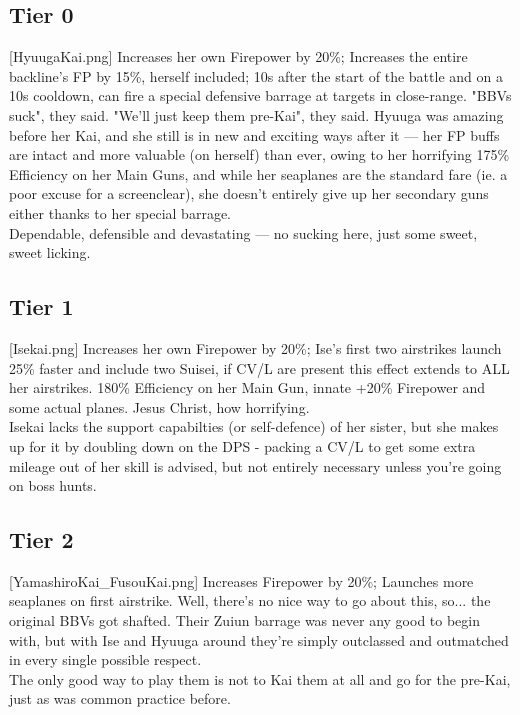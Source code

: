 \subsection{Tier 0}
[HyuugaKai.png]
{Increases her own Firepower by 20\%; Increases the entire backline's FP by 15\%, herself included; 10s after the start of the battle and on a 10s cooldown, can fire a special defensive barrage at targets in close-range.}
{"BBVs suck", they said. "We'll just keep them pre-Kai", they said.}
{Hyuuga was amazing before her Kai, and she still is in new and exciting ways after it --- her FP buffs are intact and more valuable (on herself) than ever, owing to her horrifying 175\% Efficiency on her Main Guns, and while her seaplanes are the standard fare (ie. a poor excuse for a screenclear), she doesn't entirely give up her secondary guns either thanks to her special barrage.\\
Dependable, defensible and devastating --- no sucking here, just some sweet, sweet licking.}


\newpage
\subsection{Tier 1}
[Isekai.png]
{Increases her own Firepower by 20\%; Ise's first two airstrikes launch 25\% faster and include two Suisei, if CV/L are present this effect extends to ALL her airstrikes.}
{}
{180\% Efficiency on her Main Gun, innate +20\% Firepower and some actual planes. Jesus Christ, how horrifying.\\
Isekai lacks the support capabilties (or self-defence) of her sister, but she makes up for it by doubling down on the DPS - packing a CV/L to get some extra mileage out of her skill is advised, but not entirely necessary unless you're going on boss hunts.}


\newpage
\subsection{Tier 2}
[YamashiroKai_FusouKai.png]
{Increases Firepower by 20\%; Launches more seaplanes on first airstrike.}
{}
{Well, there's no nice way to go about this, so... the original BBVs got shafted. Their Zuiun barrage was never any good to begin with, but with Ise and Hyuuga around they're simply outclassed and outmatched in every single possible respect.\\
The only good way to play them is not to Kai them at all and go for the pre-Kai, just as was common practice before.}



